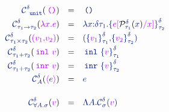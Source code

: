 \[
\begin{array}{r l l}
  \scoerce{\stunit}{\sdelta}{\tunit} & = & \sunit
  \\[0.3em]
  \scoerce{\sarrow{\staui}{\stauii}}{\sdelta}{\tabs{\tvar{x}}{\texp}} & = &
  \sabs{\svar{x}}{\sdelta\staui}{\salien{\texp\tsubst{\tvar{x}}{\prot{\svar{x}}{\staui}{\sdelta}}} {\stauii} {\sdelta}}
  \\[0.3em]
  \scoerce{\sprod{\staui}{\stauii}}{\sdelta}{\tpair{\tvali}{\tvalii}} & = &
  \spair{\salien{\tvali}{\staui}{\sdelta}}{\salien{\tvalii}{\stauii}{\sdelta}}
  \\[0.3em]
  \scoerce{\ssum{\staui}{\stauii}}{\sdelta}{\tinl{\tval}} & = &
  \sinl{\salien{\tval}{\staui}{\sdelta}}
  \\[0.3em]
  \scoerce{\ssum{\staui}{\stauii}}{\sdelta}{\tinr{\tval}} & = &
  \sinr{\salien{\tval}{\stauii}{\sdelta}}
  \\[0.3em]
  \scoerce{\svar{A}}{\sdelta}{\topaque{\sexp}} & = &
  \sexp \\[0.3em]
  & & \\
  \scoerce{\sall{\svar{A}}{\ssig}}{\sdelta}{\tval} & = &
  \stabs{\svar{A}}{\scoerce{\ssig}{\sdelta}{\tval}}
  \\[0.3em]

  

\end{array}
\]
